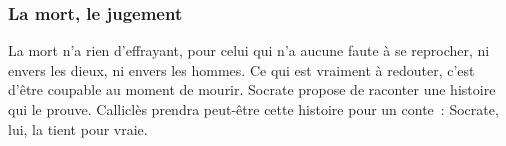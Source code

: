 \documentclass[fontsize=26pt,a4paper]{scrartcl}
\begin{document}
\subsubsection*{La mort, le jugement}

La mort n'a rien d'effrayant, pour celui qui n'a aucune faute à se reprocher, ni envers les dieux, ni envers les hommes. Ce qui est vraiment à redouter, c'est d'être coupable au moment de mourir. Socrate propose de raconter une histoire qui le prouve. Calliclès prendra peut-être cette histoire pour un conte~: Socrate, lui, la tient pour vraie.%
\end{document}
